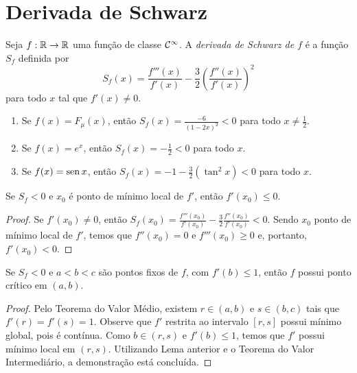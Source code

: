 \section{Derivada de Schwarz}

\begin{definition}
Seja $f: \mathbb{R} \to \mathbb{R}$ uma função de classe $\mathcal{C}^\infty$.  A \textit{derivada de Schwarz de $f$} é a função $S_f$ definida por
$$S_f(x) = \frac{f'''(x)}{f'(x)} - \frac{3}{2} \left( \frac{f''(x)}{f'(x)} \right)^2$$
para todo $x$ tal que $f'(x) \neq 0$.

\end{definition}

\begin{example}

\begin{enumerate}
\item Se $f(x) = F_{\mu}(x)$, então $S_f(x)  = \frac{-6}{(1-2x)^2} < 0$ para todo $x \neq \frac{1}{2}$.
\item Se $f(x) = e^x$, então $S_f(x) = -\frac{1}{2} < 0$ para todo $x$.
\item Se $f(x) = \operatorname{sen} x$, então $S_f(x) = -1 -\frac{3}{2}(\tan^2 x) < 0$ para todo $x$.
\end{enumerate}
\end{example}
\begin{lemma}
\label{lemma1}
Se $S_f < 0$ e $x_0$ é ponto de mínimo local de $f'$, então $f'(x_0) \leq 0$.
\end{lemma}

\begin{proof}
Se $f'(x_0) \neq 0$, então $S_f(x_0) = \frac{f'''(x_0)}{f'(x_0)} - \frac{3}{2} \frac{f''(x_0)}{f'(x_0)} < 0$. Sendo $x_0$ ponto de mínimo local de $f'$, temos que $f''(x_0) = 0$ e $f'''(x_0) \geq 0$ e, portanto,  $f'(x_0) < 0$. 
\end{proof}

\begin{lemma}
\label{lemma2}
Se $S_f < 0$ e $a<b<c$ são pontos fixos de $f$, com $f'(b) \leq 1$, então $f$ possui ponto crítico em $(a,b)$.
\end{lemma}

\begin{proof}
Pelo Teorema do Valor Médio, existem $r \in (a,b)$ e $s \in (b,c)$  tais que $f'(r) = f'(s) = 1$. Observe que $f'$ restrita ao intervalo $[r,s]$ possui mínimo global, pois é contínua. Como $b \in (r,s)$ e $f'(b) \leq 1$, temos que $f'$ possui mínimo local em $(r,s)$. Utilizando Lema anterior e o Teorema do Valor Intermediário, a demonstração está concluída.
\end{proof}


